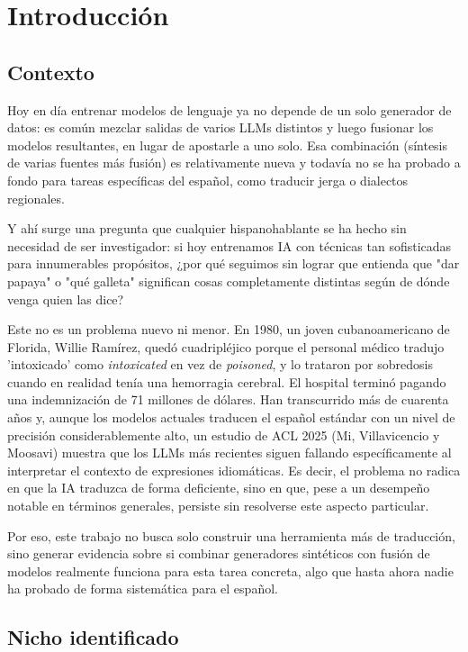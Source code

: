 \documentclass[11pt,a4paper]{article}
\begin{document}
\section{Introducción}

\subsection{Contexto}

Hoy en día entrenar modelos de lenguaje ya no depende de un solo generador de datos: es común mezclar salidas de varios LLMs distintos y luego fusionar los modelos resultantes, en lugar de apostarle a uno solo. Esa combinación (síntesis de varias fuentes más fusión) es relativamente nueva y todavía no se ha probado a fondo para tareas específicas del español, como traducir jerga o dialectos regionales.

Y ahí surge una pregunta que cualquier hispanohablante se ha hecho sin necesidad de ser investigador: si hoy entrenamos IA con técnicas tan sofisticadas para innumerables propósitos, ¿por qué seguimos sin lograr que entienda que "dar papaya" o "qué galleta" significan cosas completamente distintas según de dónde venga quien las dice?

Este no es un problema nuevo ni menor. En 1980, un joven cubanoamericano de Florida, Willie Ramírez, quedó cuadripléjico porque el personal médico tradujo 'intoxicado' como \textit{intoxicated} en vez de \textit{poisoned}, y lo trataron por sobredosis cuando en realidad tenía una hemorragia cerebral. El hospital terminó pagando una indemnización de 71 millones de dólares. Han transcurrido más de cuarenta años y, aunque los modelos actuales traducen el español estándar con un nivel de precisión considerablemente alto, un estudio de ACL 2025 (Mi, Villavicencio y Moosavi) muestra que los LLMs más recientes siguen fallando específicamente al interpretar el contexto de expresiones idiomáticas. Es decir, el problema no radica en que la IA traduzca de forma deficiente, sino en que, pese a un desempeño notable en términos generales, persiste sin resolverse este aspecto particular.

Por eso, este trabajo no busca solo construir una herramienta más de traducción, sino generar evidencia sobre si combinar generadores sintéticos con fusión de modelos realmente funciona para esta tarea concreta, algo que hasta ahora nadie ha probado de forma sistemática para el español.

\subsection{Nicho identificado}
\end{document}
